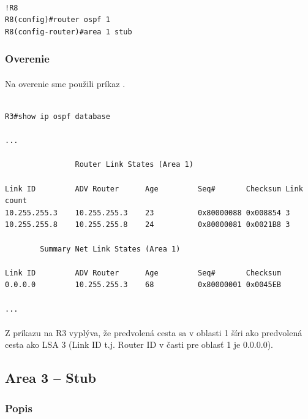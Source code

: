 \documentclass[12pt,twoside,a4paper]{report}
\begin{document}
\noindent
{\selectfont
\begin{small}
\begin{verbatim}

!R8
R8(config)#router ospf 1
R8(config-router)#area 1 stub

\end{verbatim}
\end{small}
}

\subsubsection{Overenie}
\paragraph{}
Na overenie sme použili príkaz . 

\noindent
{\selectfont
\begin{small}
\begin{verbatim}

R3#show ip ospf database

...

                Router Link States (Area 1)

Link ID         ADV Router      Age         Seq#       Checksum Link count
10.255.255.3    10.255.255.3    23          0x80000088 0x008854 3
10.255.255.8    10.255.255.8    24          0x80000081 0x0021B8 3

		Summary Net Link States (Area 1)

Link ID         ADV Router      Age         Seq#       Checksum
0.0.0.0         10.255.255.3    68          0x80000001 0x0045EB

...

\end{verbatim}
\end{small}
}

\paragraph{}
Z príkazu  na R3 vyplýva, že predvolená cesta sa v oblasti 1 šíri ako predvolená cesta ako LSA 3 (Link ID t.j. Router ID v časti  pre oblasť 1 je 0.0.0.0).

\subsection{Area 3 – Stub}
\subsubsection{Popis}
\end{document}
